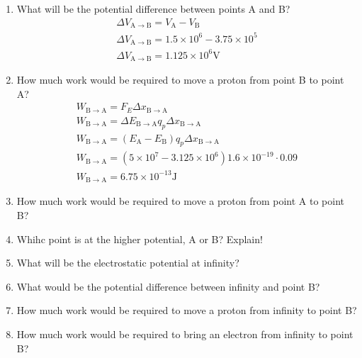 \documentclass[12pt]{article}
\begin{document}
\begin{enumerate}
\begin{enumerate}
  \item What will be the potential difference between points A and B?
    \begin{align}
      \Delta V_{\mathrm{A} \to \mathrm{B}} = V_{\mathrm{A}} - V_{\mathrm{B}} \\
      \Delta V_{\mathrm{A} \to \mathrm{B}} = 1.5 \times 10^{6} - 3.75 \times 10^{5} \\
      \Delta V_{\mathrm{A} \to \mathrm{B}} = 1.125 \times 10^{6} \mathrm{V}
    \end{align}

  \item How much work would be required to move a proton from point B to point A?
    \begin{align}
      W_{\mathrm{B} \to \mathrm{A}} = F_{E} \Delta x_{\mathrm{B} \to \mathrm{A}} \\
      W_{\mathrm{B} \to \mathrm{A}} = \Delta E_{\mathrm{B} \to \mathrm{A}} q_{p} \Delta x_{\mathrm{B} \to \mathrm{A}} \\
      W_{\mathrm{B} \to \mathrm{A}} = (E_{\mathrm{A}} - E_{\mathrm{B}}) q_{p} \Delta x_{\mathrm{B} \to \mathrm{A}} \\
      W_{\mathrm{B} \to \mathrm{A}} = (5 \times 10^{7} - 3.125 \times 10^{6}) 1.6 \times 10^{-19} \cdot 0.09 \\
      W_{\mathrm{B} \to \mathrm{A}} = 6.75 \times 10^{-13} \mathrm{J}
    \end{align}

  \item How much work would be required to move a proton from point A to point B?
  \item Whihc point is at the higher potential, A or B? Explain!
  \item What will be the electrostatic potential at infinity?
  \item What would be the potential difference between infinity and point B?
  \item How much work would be required to move a proton from infinity to point B?
  \item How much work would be required to bring an electron from infinity to point B?
\end{enumerate}


\end{enumerate}
\end{document}

